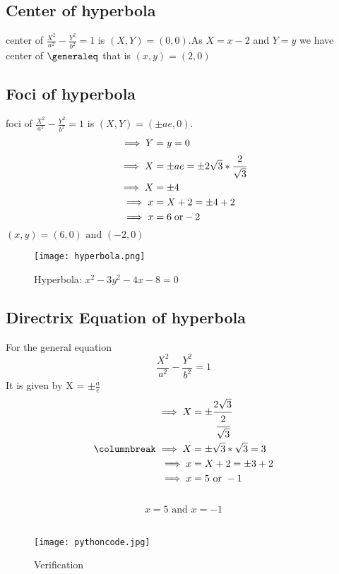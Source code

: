 \documentclass[journal,12pt,a4paper]{article}
\newcommand{\generaleqa}{\frac{X^2}{a^2} - \frac{Y^2}{b^2} = 1}
\begin{document}
\begin{multicols}{2}
  \subsection*{Center of hyperbola}
  center of $\generaleqa$ is $(X,Y) = (0,0)$.As $X = x-2$ and $Y = y$
  we have center of $ \generaleq $ that is $(x,y) = (2,0)$ \\
  
  \subsection*{Foci of hyperbola}
  foci of $\generaleqa$ is $(X,Y) = (\pm ae,0)$.
  \begin{align*}
  \implies Y &= y = 0\\
  \implies X &= \pm ae = \pm 2\sqrt{3} * \cfrac{2}{\sqrt{3}}\\
  \implies X &= \pm 4 \\
  \implies x &= X+2 = \pm 4 + 2\\
  \implies x &= 6 \; \text{or} -2\\  
  \end{align*}
  \therefore {}$(x,y) = (6,0) \text{ and } (-2,0)$ \\
  \pagebreak
  \end{multicols}
 \begin{figure}[t]
    \centering
    \texttt{[image: hyperbola.png]}
    \caption{Hyperbola: $x^{2}-3y^{2}-4x-8=0$}
    \label{fig:my_hyperbola}
\end{figure}

\begin{multicols}{3}
\subsection*{Directrix Equation of {hyperbola}}
   For the general equation $$\generaleqa$$ It is
   given by X = $\pm \frac{a}{e}$\\
   \columnbreak
  \begin{align*}
      \implies X &= \pm \cfrac{2\sqrt{3}}{\cfrac{2}{\sqrt{3}}} \\
      \columnbreak
      \implies X &= \pm \sqrt{3}*\sqrt{3} = 3 \\
      \implies x &= X+2 = \pm3+2\\
      \implies x &= 5 \text{ or } -1\\
  \end{align*}
  \therefore {}\\
     $$x=5 \text{ and } x = -1$$\\
\end{multicols}

\begin{figure}[b]
    \centering
    \texttt{[image: pythoncode.jpg]}
    \caption{Verification}
    \label{fig:my_code}
\end{figure}
\end{document}
